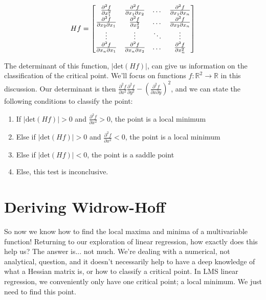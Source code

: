 \documentclass{article}
\begin{document}
\begin{equation}
Hf = \begin{bmatrix} \frac{\partial^{2}f}{\partial x_{1}^{2}} & \frac{\partial^{2}f}{\partial x_{1} \partial x_{2}} & \dots & \frac{\partial^{2}f}{\partial x_{1} \partial x_{n}} \cr \frac{\partial^{2}f}{\partial x_{2} \partial x_{1}} & \frac{\partial^{2}f}{\partial x_{2}^{2}} & \dots & \frac{\partial^{2}f}{\partial x_{2} \partial x_{n}} \cr \vdots & \vdots & \ddots & \vdots \cr \frac{\partial^{2}f}{\partial x_{n} \partial x_{1}} & \frac{\partial^{2}f}{\partial x_{n} \partial x_{2}} & \dots & \frac{\partial^{2}f}{\partial x_{n}^{2}} \cr \end{bmatrix}
\end{equation}

The determinant of this function, \(|\mathrm{det}(Hf)|\), can give us information on the classification of the critical point. We'll focus on functions \(f : \mathbb{R}^{2} \rightarrow \mathbb{R} \) in this discussion. Our determinant is then \( \frac{\partial^{2}f}{\partial x^{2}} \frac{\partial^{2}f}{\partial y^{2}} - (\frac{\partial^{2}f}{\partial x \partial y})^{2} \), and we can state the following conditions to classify the point:

\begin{enumerate}
  \item If \(|\mathrm{det}(Hf)| > 0\) and \(\frac{\partial^{2}f}{\partial x^{2}} > 0\), the point is a local minimum
  \item Else if \(|\mathrm{det}(Hf)| > 0\) and \(\frac{\partial^{2}f}{\partial x^{2}} < 0\), the point is a local minimum
  \item Else if \(|\mathrm{det}(Hf)| < 0\), the point is a saddle point
  \item Else, this test is inconclusive.
\end{enumerate}

\section{Deriving Widrow-Hoff}

So now we know how to find the local maxima and minima of a multivariable function! Returning to our exploration of linear regression, how exactly does this help us? The answer is... not much. We're dealing with a numerical, not analytical, question, and it doesn't necessarily help to have a deep knowledge of what a Hessian matrix is, or how to classify a critical point. In LMS linear regression, we conveniently only have one critical point; a local minimum. We just need to find this point.
\end{document}
